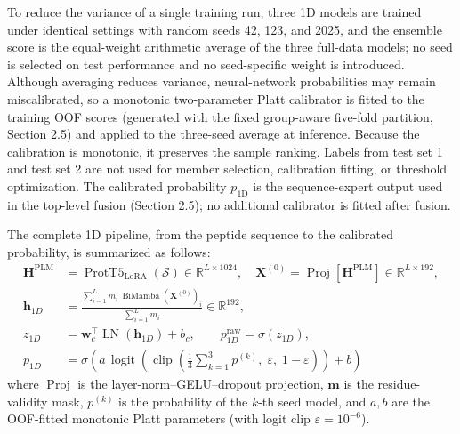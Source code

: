 \documentclass[12pt]{article}
\begin{document}
To reduce the variance of a single training run, three 1D models are trained
under identical settings with random seeds 42, 123, and 2025, and the ensemble
score is the equal-weight arithmetic average of the three full-data models; no
seed is selected on test performance and no seed-specific weight is introduced.
Although averaging reduces variance, neural-network probabilities may remain
miscalibrated, so a monotonic two-parameter Platt calibrator \cite{platt1999}
is fitted to the training OOF scores (generated with the fixed group-aware
five-fold partition, Section 2.5) and applied to the three-seed average at
inference. Because the calibration is monotonic, it preserves the sample
ranking. Labels from test set 1 and test set 2 are not used for member selection, calibration
fitting, or threshold optimization. The calibrated probability $p_{\mathrm{1D}}$
is the sequence-expert output used in the top-level fusion (Section 2.5); no
additional calibrator is fitted after fusion.

The complete 1D pipeline, from the peptide sequence to the calibrated
probability, is summarized as follows:
\begin{align}
    \mathbf H^{\mathrm{PLM}} &= \operatorname{ProtT5}_{\mathrm{LoRA}}(\mathcal{S})
        \in \mathbb{R}^{L\times1024},\quad
    \mathbf X^{(0)} = \operatorname{Proj}\left[\mathbf H^{\mathrm{PLM}}\right]
        \in \mathbb{R}^{L\times192},\label{eq:1d_encode}\\
    \mathbf h_{1D} &= \frac{\sum_{i=1}^{L} m_i\,
        \operatorname{BiMamba}\left(\mathbf X^{(0)}\right)_i}
        {\sum_{i=1}^{L} m_i} \in \mathbb{R}^{192},\label{eq:1d_pool}\\
    z_{1D} &= \mathbf w_c^{\top}\operatorname{LN}\left(\mathbf h_{1D}\right) + b_c,\qquad
    p_{1D}^{\mathrm{raw}} = \sigma\left(z_{1D}\right),\label{eq:1d_head}\\
    p_{1D} &= \sigma\left(a\,\operatorname{logit}\left(\operatorname{clip}\left(
        \frac{1}{3}\sum_{k=1}^{3} p^{(k)},\;\varepsilon,\;1-\varepsilon\right)\right)+b\right)
        \label{eq:1d_calib}
\end{align}
where $\operatorname{Proj}$ is the layer-norm--GELU--dropout projection,
$\mathbf m$ is the residue-validity mask, $p^{(k)}$ is the probability of the
$k$-th seed model, and $a,b$ are the OOF-fitted monotonic Platt parameters
(with logit clip $\varepsilon = 10^{-6}$).
\end{document}
